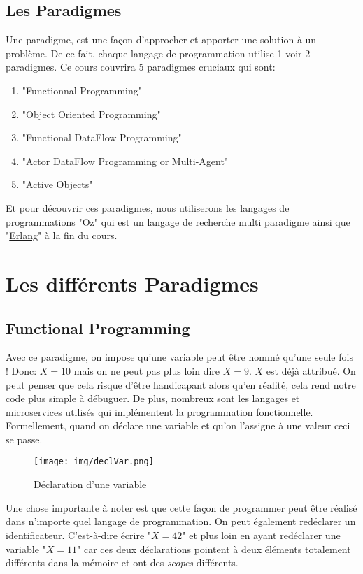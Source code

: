 \documentclass{report}
\begin{document}
\section{Les Paradigmes}
Une paradigme, est une façon d'approcher et apporter une solution à un problème. De ce fait, chaque langage de programmation utilise 1 voir 2 paradigmes. Ce cours couvrira 5 paradigmes cruciaux qui sont:
\begin{enumerate}
\item "Functionnal Programming"
\item "Object Oriented Programming"
\item "Functional DataFlow Programming"
\item "Actor DataFlow Programming or Multi-Agent"
\item "Active Objects"
\end{enumerate}

Et pour découvrir ces paradigmes, nous utiliserons les langages de programmations "\href{https://fr.wikipedia.org/wiki/Oz_(langage)}{Oz}" qui est un langage de recherche multi paradigme ainsi que "\href{https://fr.wikipedia.org/wiki/Erlang_(langage)}{Erlang}" à la fin du cours.

\chapter{Les différents Paradigmes}
\section{Functional Programming}
Avec ce paradigme, on impose qu'une variable peut être nommé qu'une seule fois ! Donc: $X = 10$ mais on ne peut pas plus loin dire $X = 9$. $X$ est déjà attribué. On peut penser que cela risque d'être handicapant alors qu'en réalité, cela rend notre code plus simple à débuguer. De plus, nombreux sont les langages et microservices utilisés qui implémentent la programmation fonctionnelle.
Formellement, quand on déclare une variable et qu'on l'assigne à une valeur ceci se passe.
\begin{wrapfigure}{r}{.45\textwidth}
	\centering
    \texttt{[image: img/declVar.png]}
    \caption{Déclaration d'une variable}
\end{wrapfigure}
Une chose importante à noter est que cette façon de programmer peut être réalisé dans n'importe quel langage de programmation. On peut également redéclarer un identificateur. C'est-à-dire écrire "$X = 42$" et plus loin en ayant redéclarer une variable "$X = 11$" car ces deux déclarations pointent à deux éléments totalement différents dans la mémoire et ont des \textit{scopes} différents.\\
\end{document}
